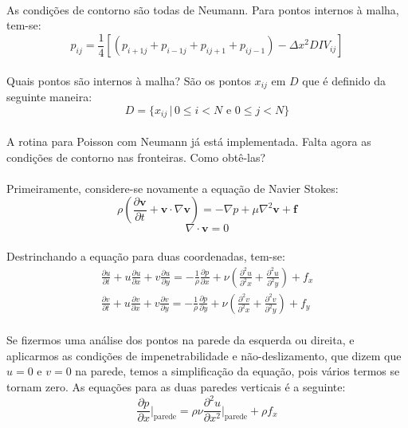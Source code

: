 \documentclass[poisson.tex]{subfiles}
\begin{document}
\paragraph{} As condições de contorno são todas de Neumann. Para pontos internos à malha, tem-se:
\begin{equation}
p_{ij}=\frac{1}{4}[(p_{i+1j}+p_{i-1j}+p_{ij+1}+p_{ij-1})-\Delta x^2 DIV_{ij}]
\end{equation}
\paragraph{} Quais pontos são internos à malha? São os pontos $x_{ij}$ em $D$ que é definido da seguinte maneira:
\begin{equation}
D = \{x_{ij}\,|\, 0\le i < N \textrm{ e } 0\le j < N \}
\end{equation}
\paragraph{} A rotina para Poisson com Neumann já está implementada. Falta agora
as condições de contorno nas fronteiras. Como obtê-las?
\paragraph{} Primeiramente, considere-se novamente a equação de Navier Stokes:
\[\rho\left( \frac{\partial \textbf{v}}{\partial t}+\textbf{v}\cdot\nabla\textbf{v}\right)=-\nabla p+\mu\nabla^2\textbf{v}+\textbf{f}\]
\[\nabla\cdot\textbf{v}=0\]
\paragraph{} Destrinchando a equação para duas coordenadas, tem-se:
\begin{eqnarray}
\frac{\partial u}{\partial t}+u\frac{\partial u}{\partial x}+v\frac{\partial
u}{\partial y}=-\frac{1}{\rho}\frac{\partial p}{\partial
x}+\nu\left(\frac{\partial^2 u}{\partial^2 x}+\frac{\partial^2 u}{\partial^2
y}\right)+f_x\\
\frac{\partial v}{\partial t}+u\frac{\partial v}{\partial x}+v\frac{\partial
v}{\partial y}=-\frac{1}{\rho}\frac{\partial p}{\partial
y}+\nu\left(\frac{\partial^2 v}{\partial^2 x}+\frac{\partial^2 v}{\partial^2
y}\right)+f_y
\end{eqnarray}
\paragraph{} Se fizermos uma análise dos pontos na parede da esquerda ou
direita, e aplicarmos as condições de impenetrabilidade e não-deslizamento, que
dizem que $u=0$ e $v=0$ na parede, temos a simplificação da equação, pois vários
termos se tornam zero. As equações para as duas paredes verticais é a seguinte:
\begin{equation}
\frac{\partial p}{\partial x}\Bigg|_{\textrm{parede}}=\rho\nu\frac{\partial^2
u}{\partial x^2}\Bigg|_{\textrm{parede}}+\rho f_x
\end{equation}
\end{document}
